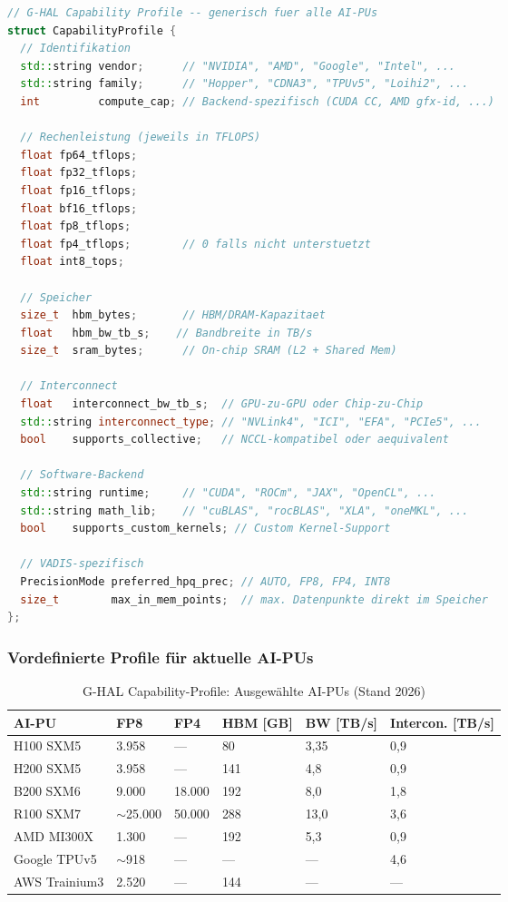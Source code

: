 ﻿\documentclass[12pt,a4paper]{article}
\begin{document}
\begin{lstlisting}[language=C++, caption={G-HAL Capability-Profil-Schema}]
// G-HAL Capability Profile -- generisch fuer alle AI-PUs
struct CapabilityProfile {
  // Identifikation
  std::string vendor;      // "NVIDIA", "AMD", "Google", "Intel", ...
  std::string family;      // "Hopper", "CDNA3", "TPUv5", "Loihi2", ...
  int         compute_cap; // Backend-spezifisch (CUDA CC, AMD gfx-id, ...)
  
  // Rechenleistung (jeweils in TFLOPS)
  float fp64_tflops;
  float fp32_tflops;
  float fp16_tflops;
  float bf16_tflops;
  float fp8_tflops;
  float fp4_tflops;        // 0 falls nicht unterstuetzt
  float int8_tops;
  
  // Speicher
  size_t  hbm_bytes;       // HBM/DRAM-Kapazitaet
  float   hbm_bw_tb_s;    // Bandbreite in TB/s
  size_t  sram_bytes;      // On-chip SRAM (L2 + Shared Mem)
  
  // Interconnect
  float   interconnect_bw_tb_s;  // GPU-zu-GPU oder Chip-zu-Chip
  std::string interconnect_type; // "NVLink4", "ICI", "EFA", "PCIe5", ...
  bool    supports_collective;   // NCCL-kompatibel oder aequivalent
  
  // Software-Backend
  std::string runtime;     // "CUDA", "ROCm", "JAX", "OpenCL", ...
  std::string math_lib;    // "cuBLAS", "rocBLAS", "XLA", "oneMKL", ...
  bool    supports_custom_kernels; // Custom Kernel-Support
  
  // VADIS-spezifisch
  PrecisionMode preferred_hpq_prec; // AUTO, FP8, FP4, INT8
  size_t        max_in_mem_points;  // max. Datenpunkte direkt im Speicher
};
\end{lstlisting}

\subsubsection{Vordefinierte Profile für aktuelle AI-PUs}

\begin{table}[ht]
\centering
\small
\caption{G-HAL Capability-Profile: Ausgewählte AI-PUs (Stand 2026)}
\label{tab:cap_profiles}
\begin{tabular}{@{}p{1.8cm}p{1.2cm}p{1.2cm}p{1.2cm}p{1.2cm}p{1.5cm}@{}}
\toprule
\textbf{AI-PU} & \textbf{FP8} & \textbf{FP4} & \textbf{HBM [GB]} & \textbf{BW [TB/s]} & \textbf{Intercon. [TB/s]} \\
\midrule
H100 SXM5 & 3.958 & --- & 80 & 3,35 & 0,9 \\
H200 SXM5 & 3.958 & --- & 141 & 4,8 & 0,9 \\
B200 SXM6 & 9.000 & 18.000 & 192 & 8,0 & 1,8 \\
R100 SXM7 & $\sim$25.000 & 50.000 & 288 & 13,0 & 3,6 \\
AMD MI300X & 1.300 & --- & 192 & 5,3 & 0,9 \\
Google TPUv5 & $\sim$918 & --- & --- & --- & 4,6 \\
AWS Trainium3 & 2.520 & --- & 144 & --- & --- \\
\bottomrule
\end{tabular}
\end{table}
\end{document}
